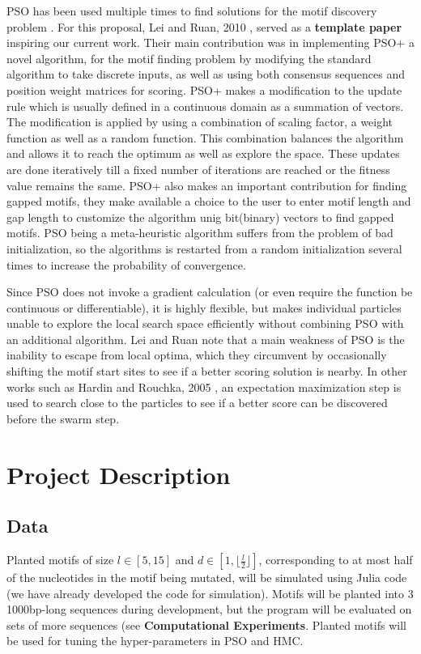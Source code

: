 \documentclass{article}
\begin{document}
PSO has been used multiple times to find solutions for the motif discovery problem \cite{hardin2005dna,lei2010particle,reddy2010planted,ge2019discovery}. For this proposal, Lei and Ruan, 2010 \cite{lei2010particle}, served as a \textbf{template paper} inspiring our current work. Their main contribution was in implementing PSO+ a novel algorithm, for the motif finding problem by modifying the standard algorithm to take discrete inputs, as well as using both consensus sequences and position weight matrices for scoring. PSO+ makes a modification to the update rule which is usually defined in a continuous domain as a summation of vectors. The modification is applied by using a combination of scaling factor, a weight function as well as a random function. This combination balances the algorithm and allows it to reach the optimum as well as explore the space. These updates are done iteratively till a fixed number of iterations are reached or the fitness value remains the same. PSO+ also makes an important contribution for finding gapped motifs, they make available a choice to the user to enter motif length and gap length to customize the algorithm unig bit(binary) vectors to find gapped motifs. 
PSO being a meta-heuristic algorithm suffers from the problem of bad initialization, so the algorithms is restarted from a random initialization several times to increase the probability of convergence.

Since PSO does not invoke a gradient calculation (or even require the function be continuous or differentiable), it is highly flexible, but makes individual particles unable to explore the local search space efficiently without combining PSO with an additional algorithm. Lei and Ruan note that a main weakness of PSO is the inability to escape from local optima, which they circumvent by occasionally shifting the motif start sites to see if a better scoring solution is nearby. In other works such as Hardin and Rouchka, 2005 \cite{hardin2005dna}, an expectation maximization step is used to search close to the particles to see if a better score can be discovered before the swarm step.

\section{Project Description}
\subsection{Data}
Planted motifs of size $l \in [5, 15]$ and $d \in [1, \lfloor \frac{l}{2} \rfloor]$, corresponding to at most half of the nucleotides in the motif being mutated, will be simulated using Julia code (we have already developed the code for simulation). Motifs will be planted into $3$ 1000bp-long sequences during development, but the program will be evaluated on sets of more sequences (see \textbf{Computational Experiments}. Planted motifs will be used for tuning the hyper-parameters in PSO and HMC.  
  
\end{document}
